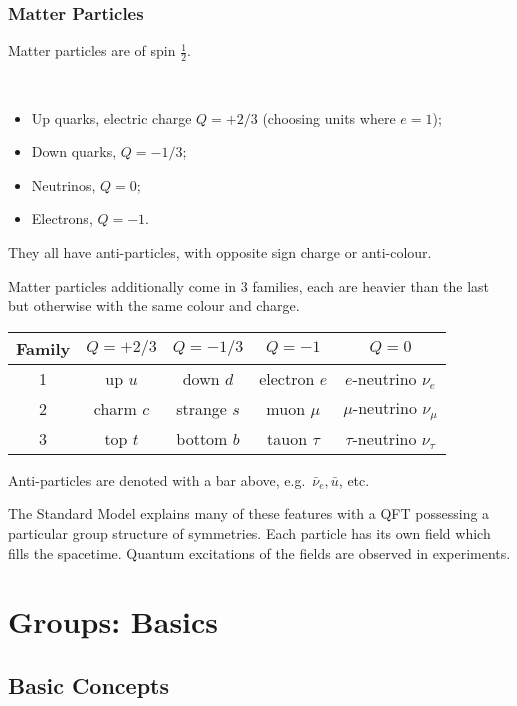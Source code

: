 \documentclass[a4paper,11pt]{article}
\begin{document}
	\subsubsection{Matter Particles} 
	Matter particles are of spin $\frac{1}{2}$.
	\begin{ex}
		\
		\begin{itemize}
			\item Up quarks, electric charge $Q = + 2/3$ (choosing units where $e = 1$);
			\item Down quarks, $Q = -1/3$; 
			\item Neutrinos, $Q = 0$;
			\item Electrons, $Q = -1$.
		\end{itemize}

		They all have anti-particles, with opposite sign charge or anti-colour.
	\end{ex}

	Matter particles additionally come in 3 families, each are heavier than the last but otherwise with the same colour and charge.

	\begin{table}[H]
		\centering
		\begin{tabular}{c|c|c|c|c}		
			\hline
			Family & $Q = + 2/3$ & $Q = - 1/3$ & $Q = -1$ & $Q = 0$ \\
			\hline
			1 & up $u$ & down $d$ & electron $e$ & $e$-neutrino $\nu_e$\\
			2 & charm $c$ & strange $s$ & muon $\mu$ & $\mu$-neutrino $\nu_\mu$\\
			3 & top $t$ & bottom $b$ & tauon $\tau$ & $\tau$-neutrino $\nu_\tau$\\
			\hline
		\end{tabular}		
	\end{table}

	Anti-particles are denoted with a bar above, e.g.\ $\bar{\nu}_e, \bar{u}$, etc.

	The Standard Model explains many of these features with a QFT possessing a particular group structure of symmetries. Each particle has its own field which fills the spacetime. Quantum excitations of the fields are observed in experiments.
	\newpage

	\section{Groups: Basics} 

	\subsection{Basic Concepts}
\end{document}
